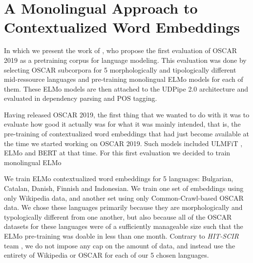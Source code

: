 \chapter{A Monolingual Approach to Contextualized Word Embeddings}

\begin{center}
    \begin{minipage}{0.66\textwidth}
        \begin{small}
            In which we present the work of \citet{ortiz-suarez-etal-2020-monolingual}, who propose the first evaluation of OSCAR 2019 as a pretraining corpus for language modeling. This evaluation was done by selecting OSCAR subcorpora for 5 morphologically and tipologically different mid-ressource languages and pre-training monolingual ELMo models \citep{peters-etal-2018-deep} for each of them. These ELMo models are then attached to the UDPipe 2.0 architecture \citep{straka-2018-udpipe,straka-strakova-2019-evaluating} and evaluated in dependency parsing and POS tagging.
        \end{small}
    \end{minipage}
    \vspace{0.5cm}
\end{center}

Having released OSCAR 2019, the first thing that we wanted to do with it was to evaluate how good it actually was for what it was mainly intended, that is, the pre-training of contextualized word embeddings that had just become available at the time we started working on OSCAR 2019. Such models included ULMFiT \citep{howard-ruder-2018-universal}, ELMo \citep{peters-etal-2018-deep} and BERT \citep{devlin-etal-2019-bert} at that time. For this first evaluation we decided to train monolingual ELMo 


We train ELMo contextualized word embeddings for 5 languages: Bulgarian, Catalan, Danish, Finnish and Indonesian. We train one set of embeddings using only Wikipedia data, and another set using only  Common-Crawl-based OSCAR data. We chose these languages primarily because they are morphologically and typologically different from one another, but also because all of the OSCAR datasets for these languages were of a sufficiently manageable size such that the ELMo pre-training was doable in less than one month. Contrary to \emph{HIT-SCIR} team \citep{che-etal-2018-towards}, we do not impose any cap on the amount of data, and instead use the entirety of Wikipedia or OSCAR for each of our 5 chosen languages.

